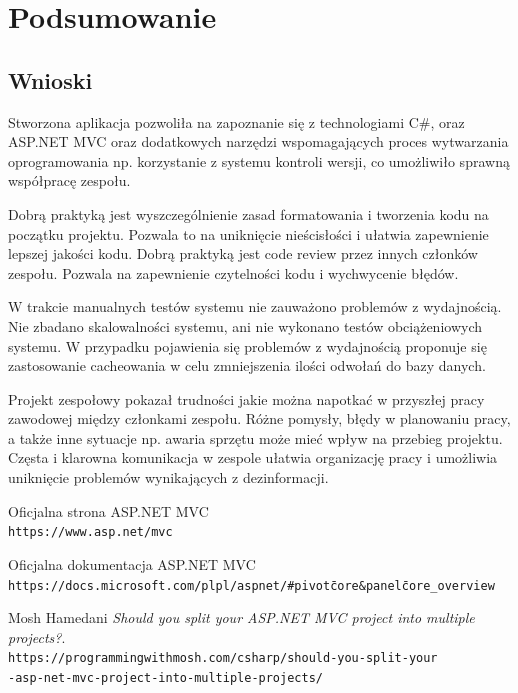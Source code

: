 \documentclass{article}
\begin{document}
\section{Podsumowanie}

\subsection{Wnioski}
Stworzona aplikacja pozwoliła na zapoznanie się z technologiami C\#, oraz \\ ASP.NET MVC oraz dodatkowych narzędzi wspomagających proces wytwarzania oprogramowania np. korzystanie z systemu kontroli wersji, co umożliwiło sprawną współpracę zespołu.  

Dobrą praktyką jest wyszczególnienie zasad formatowania i tworzenia kodu na początku projektu. Pozwala to na uniknięcie nieścisłości i ułatwia zapewnienie lepszej jakości kodu. Dobrą praktyką jest code review przez innych członków zespołu. Pozwala na zapewnienie czytelności kodu i wychwycenie błędów. 

W trakcie manualnych testów systemu nie zauważono problemów z wydajnością. Nie zbadano skalowalności systemu, ani nie wykonano testów obciążeniowych systemu. W przypadku pojawienia się problemów z wydajnością proponuje się zastosowanie cacheowania w celu zmniejszenia ilości odwołań do bazy danych.

Projekt zespołowy pokazał trudności jakie można napotkać w przyszłej pracy zawodowej między członkami zespołu. Różne pomysły, błędy w planowaniu pracy, a także inne sytuacje np. awaria sprzętu może mieć wpływ na przebieg projektu. Częsta i klarowna komunikacja w zespole ułatwia organizację pracy i umożliwia uniknięcie problemów wynikających z dezinformacji.


\newpage
\begin{thebibliography}{9}

Oficjalna strona ASP.NET MVC
\\\texttt{https://www.asp.net/mvc}

Oficjalna dokumentacja ASP.NET MVC
\\\texttt{https://docs.microsoft.com/pl\-pl/aspnet/\#pivot\=core\&panel\=core\_overview}

Mosh Hamedani
\textit{Should you split your ASP.NET MVC project into multiple projects?}.
\\\texttt{https://programmingwithmosh.com/csharp/should-you-split-your\\-asp-net-mvc-project-into-multiple-projects/}

\end{thebibliography}
\newpage

\listoffigures
\newpage
\end{document}
